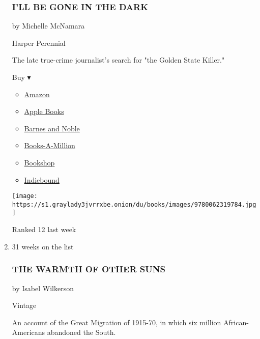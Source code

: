 \begin{enumerate}
{  \subsubsection{I'LL BE GONE IN THE
  DARK}\label{ill-be-gone-in-the-dark}}

  by Michelle McNamara

  Harper Perennial

  The late true-crime journalist's search for "the Golden State Killer."

  Buy ▾

  \begin{itemize}
  \tightlist
  \item
    \href{https://www.amazon.com/Ill-Be-Gone-Dark-Obsessive/dp/0062319787?tag=NYTBS-20}{Amazon}
  \item
    \href{https://du-gae-books-dot-nyt-du-prd.appspot.com/buy?title=I\%27LL+BE+GONE+IN+THE+DARK\&author=Michelle+McNamara}{Apple
    Books}
  \item
    \href{https://www.anrdoezrs.net/click-7990613-11819508?url=https\%3A\%2F\%2Fwww.barnesandnoble.com\%2Fw\%2F\%3Fean\%3D9780062319791}{Barnes
    and Noble}
  \item
    \href{https://www.anrdoezrs.net/click-7990613-35140?url=https\%3A\%2F\%2Fwww.booksamillion.com\%2Fp\%2FI\%2527LL\%2BBE\%2BGONE\%2BIN\%2BTHE\%2BDARK\%2FMichelle\%2BMcNamara\%2F9780062319791}{Books-A-Million}
  \item
    \href{https://bookshop.org/a/3546/9780062319791}{Bookshop}
  \item
    \href{https://www.indiebound.org/book/9780062319791?aff=NYT}{Indiebound}
  \end{itemize}

  \texttt{[image: https://s1.graylady3jvrrxbe.onion/du/books/images/9780062319784.jpg]}

  Ranked 12 last week
\item
  \href{https://www.nytimes3xbfgragh.onion/2010/08/31/books/31book.html}{}

  31 weeks on the list

  \hypertarget{the-warmth-of-other-suns}{%
  \subsubsection{THE WARMTH OF OTHER
  SUNS}\label{the-warmth-of-other-suns}}

  by Isabel Wilkerson

  Vintage

  An account of the Great Migration of 1915-70, in which six million
  African-Americans abandoned the South.


\end{enumerate}
